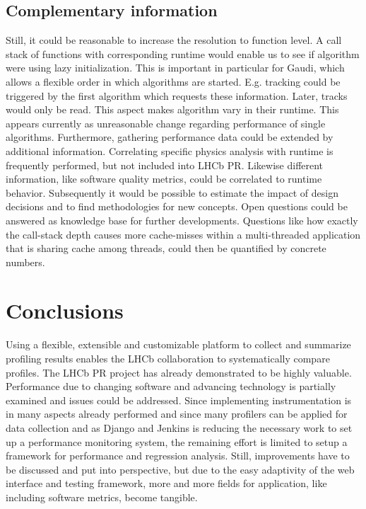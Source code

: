 \documentclass[a4paper]{jpconf}
\begin{document}
\subsection{Complementary information}
\label{sec:complementary_information}

Still, it could be reasonable to increase the resolution to function level. A call stack of functions with corresponding runtime would enable us to see if algorithm were using lazy initialization. This is important in particular for Gaudi, which allows a flexible order in which algorithms are started. E.g. tracking could be triggered by the first algorithm which requests these information. Later, tracks would only be read. This aspect makes algorithm vary in their runtime. This appears currently as unreasonable change regarding performance of single algorithms.
\newline
Furthermore, gathering performance data could be extended by additional information. Correlating specific physics analysis with runtime is frequently performed, but not included into LHCb PR. Likewise different information, like software quality metrics, could be correlated to runtime behavior. Subsequently it would be possible to estimate the impact of design decisions and to find methodologies for new concepts. Open questions could be answered as knowledge base for further developments. Questions like how exactly the call-stack depth causes more cache-misses within a multi-threaded application that is sharing cache among threads, could then be quantified by concrete numbers.

\section{Conclusions}
\label{sec:conclusions}

Using a flexible, extensible and customizable platform to collect and summarize profiling results enables the LHCb collaboration to systematically compare profiles. The LHCb PR project has already demonstrated to be highly valuable. Performance due to changing software and advancing technology is partially examined and issues could be addressed. Since implementing instrumentation is in many aspects already performed and since many profilers can be applied for data collection and as Django and Jenkins is reducing the necessary work to set up a performance monitoring system, the remaining effort is limited to setup a framework for performance and regression analysis. Still, improvements have to be discussed and put into perspective, but due to the easy adaptivity of the web interface and testing framework, more and more fields for application, like including software metrics, become tangible. 
\end{document}
